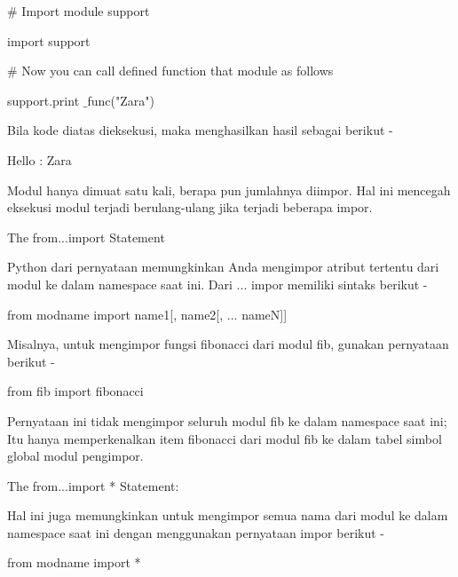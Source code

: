 \vspace{12pt}
\noindent 
 \hspace*{0.5in}  $  \#  $ Import module support \par
\noindent 
 \hspace*{0.5in} import support \par
\vspace{12pt}
\noindent 
 \hspace*{0.5in}  $  \#  $ Now you can call defined function that module as follows \par
\noindent 
 \hspace*{0.5in} support.print $  \_  $func("Zara") \par
\noindent 
Bila kode diatas dieksekusi, maka menghasilkan hasil sebagai berikut - \par
\noindent 
 \hspace*{0.5in} Hello : Zara \par
\noindent 
Modul hanya dimuat satu kali, berapa pun jumlahnya diimpor. Hal ini mencegah eksekusi modul terjadi berulang-ulang jika terjadi beberapa impor. \par
\vspace{12pt}
\noindent 
The $  $from...import $  $Statement \par
\noindent 
Python dari pernyataan memungkinkan Anda mengimpor atribut tertentu dari modul ke dalam namespace saat ini. Dari ... impor memiliki sintaks berikut - \par
\noindent 
 \hspace*{0.5in} from modname import name1[, name2[, ... nameN]] \par
\noindent 
Misalnya, untuk mengimpor fungsi fibonacci dari modul fib, gunakan pernyataan berikut - \par
\noindent 
 \hspace*{0.5in} from fib import fibonacci \par
\noindent 
Pernyataan ini tidak mengimpor seluruh modul fib ke dalam namespace saat ini; Itu hanya memperkenalkan item fibonacci dari modul fib ke dalam tabel simbol global modul pengimpor. \par
\vspace{12pt}
\noindent 
The $  $from...import * $  $Statement: \par
\noindent 
Hal ini juga memungkinkan untuk mengimpor semua nama dari modul ke dalam namespace saat ini dengan menggunakan pernyataan impor berikut - \par
\noindent 
 \hspace*{0.5in} from modname import * \par
